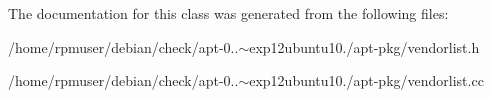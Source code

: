 \-The documentation for this class was generated from the following files\-:\begin{DoxyCompactItemize}
\item 
/home/rpmuser/debian/check/apt-\/0..$\sim$exp12ubuntu10./apt-\/pkg/vendorlist.\-h\item 
/home/rpmuser/debian/check/apt-\/0..$\sim$exp12ubuntu10./apt-\/pkg/vendorlist.\-cc\end{DoxyCompactItemize}

